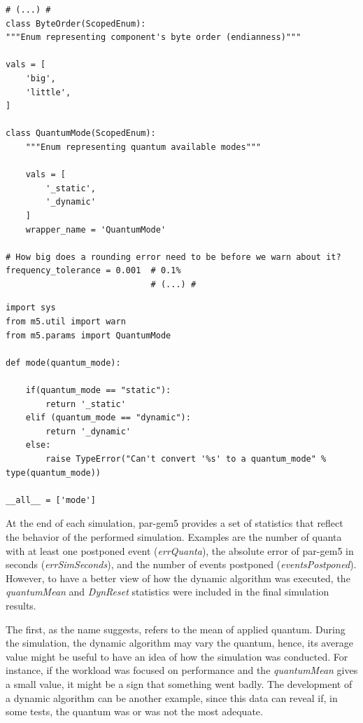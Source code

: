 \newpage

\begin{lstlisting}[style=customPython, caption={Snippet of Params.py}, label=SnippetParams]
                             # (...) #
class ByteOrder(ScopedEnum):
"""Enum representing component's byte order (endianness)"""

vals = [
    'big',
    'little',
]

class QuantumMode(ScopedEnum):  
    """Enum representing quantum available modes"""

    vals = [
        '_static',
        '_dynamic'
    ]
    wrapper_name = 'QuantumMode'

# How big does a rounding error need to be before we warn about it?
frequency_tolerance = 0.001  # 0.1%
                             # (...) #
\end{lstlisting}

\begin{lstlisting}[style=customPython, caption={Quantum.py file}, label=SnippetQuantum]
import sys
from m5.util import warn
from m5.params import QuantumMode

def mode(quantum_mode):

    if(quantum_mode == "static"):
        return '_static'
    elif (quantum_mode == "dynamic"):
        return '_dynamic'
    else:
        raise TypeError("Can't convert '%s' to a quantum_mode" % type(quantum_mode))

__all__ = ['mode']
\end{lstlisting}


At the end of each simulation, par-gem5 provides a set of statistics that reflect the behavior of the performed simulation. Examples are 
the number of quanta with at least one postponed event (\textit{errQuanta}), the absolute error of par-gem5 in seconds (\textit{errSimSeconds}), 
and the number of events postponed (\textit{eventsPostponed}). However, to have a better view of how the dynamic algorithm was executed, 
the \textit{quantumMean} and \textit{DynReset} statistics were included in the final simulation results. 

The first, as the name suggests, refers to the mean of applied quantum. During the simulation, the dynamic algorithm may vary the quantum, 
hence, its average value might be useful to have an idea of how the simulation was conducted. For instance, if the workload was 
focused on performance and the \textit{quantumMean} gives a small value, it might be a sign that something went badly. The development of a 
dynamic algorithm can be another example, since this data can reveal if, in some tests, the quantum was or was not the most adequate.

